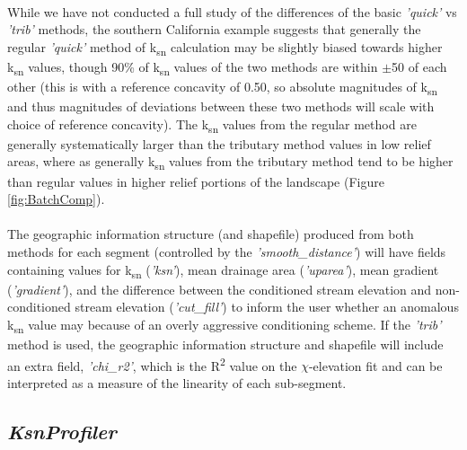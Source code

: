 \paragraph{}While we have not conducted a full study of the differences of the basic \textit{'quick'} vs \textit{'trib'} methods, the southern California example suggests that generally the regular \textit{'quick'} method of k\textsubscript{sn} calculation may be slightly biased towards higher k\textsubscript{sn} values, though 90\% of k\textsubscript{sn} values of the two methods are within $\pm$50 of each other (this is with a reference concavity of 0.50, so absolute magnitudes of k\textsubscript{sn} and thus magnitudes of deviations between these two methods will scale with choice of reference concavity). The k\textsubscript{sn} values from the regular method are generally systematically larger than the tributary method values in low relief areas, where as generally k\textsubscript{sn} values from the tributary method tend to be higher than regular values in higher relief portions of the landscape (Figure \ref{fig:BatchComp}). 

\paragraph{}The geographic information structure (and shapefile) produced from both methods for each segment (controlled by the \textit{'smooth\_distance'}) will have fields containing values for k\textsubscript{sn} (\textit{'ksn'}), mean drainage area (\textit{'uparea'}), mean gradient (\textit{'gradient'}), and the difference between the conditioned stream elevation and non-conditioned stream elevation (\textit{'cut\_fill'}) to inform the user whether an anomalous k\textsubscript{sn} value may because of an overly aggressive conditioning scheme. If the \textit{'trib'} method is used, the geographic information structure and shapefile will include an extra field, \textit{'chi\_r2'}, which is the R\textsuperscript{2} value on the $\chi$-elevation fit and can be interpreted as a measure of the linearity of each sub-segment. 

\subsection{\textit{KsnProfiler}} \label{sec:KsnProfiler}

